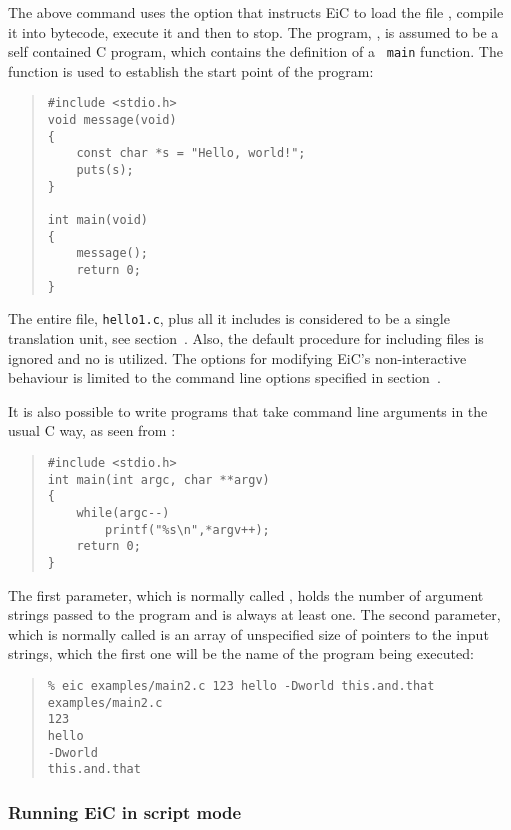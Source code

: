 The above command uses the  option that instructs EiC to
load the file , compile it into bytecode, execute it and
then to stop.  The program, , is assumed to be a self
contained C program, which contains the definition of a {\tt
main} function. The  function is used to establish
the start point of the program:

\begin{quote} 
\begin{verbatim}
#include <stdio.h>
void message(void)
{
    const char *s = "Hello, world!";
    puts(s);
}

int main(void)
{
    message();
    return 0;
}
\end{verbatim}
\end{quote}

The entire file, {\tt hello1.c}, plus all it includes is considered
to be a single translation unit, see
section~. Also, the default procedure for
including  files is ignored and no  is
utilized. The options for modifying EiC's non-interactive behaviour is
limited to the command line options specified in
section~.

It is also possible to write programs that take command line arguments
in the usual C way, as seen from :

\begin{quote} 
\begin{verbatim}
#include <stdio.h>
int main(int argc, char **argv)
{
    while(argc--)
        printf("%s\n",*argv++);
    return 0;
}
\end{verbatim}
\end{quote}

The first parameter, which is normally called , holds the
number of argument strings passed to the program and is always at
least one. The second parameter, which is normally called
 is an array of unspecified size of pointers to the input  strings, 
which the first one will be the name of the program being executed:

\begin{quote} 
\begin{verbatim}
% eic examples/main2.c 123 hello -Dworld this.and.that
examples/main2.c
123
hello
-Dworld
this.and.that
\end{verbatim}
\end{quote}


\subsubsection{Running EiC in script mode}
\label{sec:ScriptMode}

